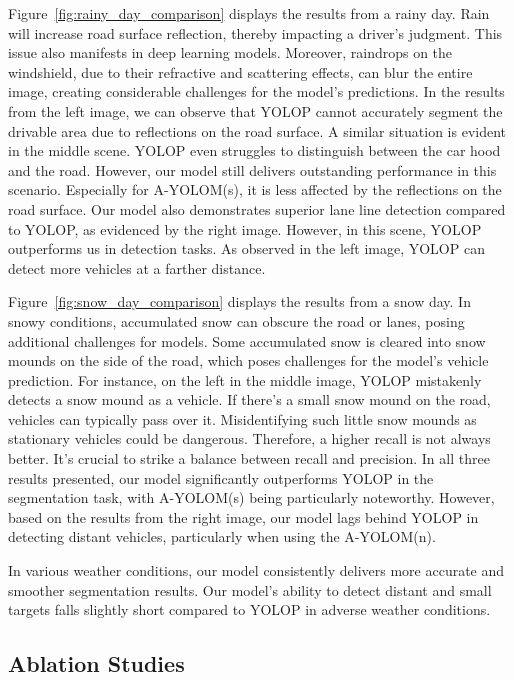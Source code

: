 \documentclass[lettersize,journal]{IEEEtran}
\begin{document}
{Figure~\ref{fig:rainy_day_comparison} displays the results from a rainy day. Rain will increase road surface reflection, thereby impacting a driver's judgment. This issue also manifests in deep learning models. Moreover, raindrops on the windshield, due to their refractive and scattering effects, can blur the entire image, creating considerable challenges for the model's predictions. In the results from the left image, we can observe that YOLOP cannot accurately segment the drivable area due to reflections on the road surface. A similar situation is evident in the middle scene. YOLOP even struggles to distinguish between the car hood and the road. However, our model still delivers outstanding performance in this scenario. Especially for A-YOLOM(s), it is less affected by the reflections on the road surface. Our model also demonstrates superior lane line detection compared to YOLOP, as evidenced by the right image. However, in this scene, YOLOP outperforms us in detection tasks. As observed in the left image, YOLOP can detect more vehicles at a farther distance.


Figure~\ref{fig:snow_day_comparison} displays the results from a snow day. In snowy conditions, accumulated snow can obscure the road or lanes, posing additional challenges for models. Some accumulated snow is cleared into snow mounds on the side of the road, which poses challenges for the model's vehicle prediction. For instance, on the left in the middle image, YOLOP mistakenly detects a snow mound as a vehicle. If there's a small snow mound on the road, vehicles can typically pass over it. Misidentifying such little snow mounds as stationary vehicles could be dangerous. Therefore, a higher recall is not always better. It's crucial to strike a balance between recall and precision. In all three results presented, our model significantly outperforms YOLOP in the segmentation task, with A-YOLOM(s) being particularly noteworthy. However, based on the results from the right image, our model lags behind YOLOP in detecting distant vehicles, particularly when using the A-YOLOM(n).

In various weather conditions, our model consistently delivers more accurate and smoother segmentation results. Our model's ability to detect distant and small targets falls slightly short compared to YOLOP in adverse weather conditions.

\subsection{Ablation Studies}
\label{subsec: Ablation Studies}
\begin{figure*}[!h]
    \centering
    

\end{figure*}}
\end{document}
